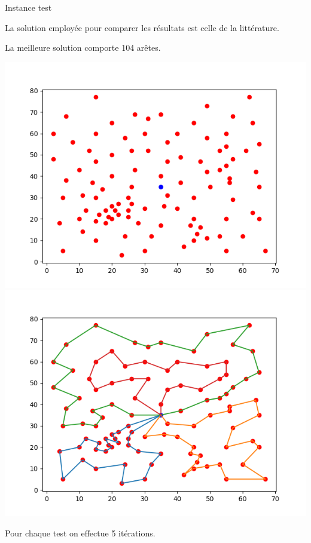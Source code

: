 \documentclass{beamer}
\begin{document}
\begin{frame}{Instance test}

La solution employée pour comparer les résultats est celle de la littérature.

La meilleure solution comporte 104 arêtes.

\includegraphics[scale=0.3]{Instance10104.png}
\includegraphics[scale=0.3]{Solution10104.png}

Pour chaque test on effectue 5 itérations.
\end{frame}
\end{document}
